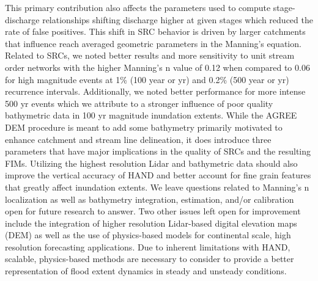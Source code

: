 This primary contribution also affects the parameters used to compute stage-discharge relationships shifting discharge higher at given stages which reduced the rate of false positives.
This shift in SRC behavior is driven by larger catchments that influence reach averaged geometric parameters in the Manning's equation.
Related to SRCs, we noted better results and more sensitivity to unit stream order networks with the higher Manning's n value of 0.12 when compared to 0.06 for high magnitude events at 1\% (100 year or yr) and 0.2\% (500 year or yr) recurrence intervals.
Additionally, we noted better performance for more intense 500 yr events which we attribute to a stronger influence of poor quality bathymetric data in 100 yr magnitude inundation extents.
While the AGREE DEM procedure is meant to add some bathymetry primarily motivated to enhance catchment and stream line delineation, it does introduce three parameters that have major implications in the quality of SRCs and the resulting FIMs.
Utilizing the highest resolution Lidar and bathymetric data should also improve the vertical accuracy of HAND and better account for fine grain features that greatly affect inundation extents.
We leave questions related to Manning's n localization as well as bathymetry integration, estimation, and/or calibration open for future research to answer.
Two other issues left open for improvement include the integration of higher resolution Lidar-based digital elevation maps (DEM) as well as the use of physics-based models for continental scale, high resolution forecasting applications.
Due to inherent limitations with HAND, scalable, physics-based methods are necessary to consider to provide a better representation of flood extent dynamics in steady and unsteady conditions.
